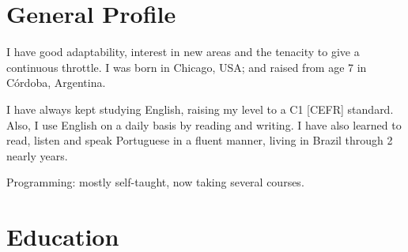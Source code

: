 \section{General Profile}

I have good adaptability, interest in new areas and the tenacity to give a continuous throttle. I was born in Chicago, USA; and raised from age 7 in Córdoba, Argentina. 

I have always kept studying English, raising my level to a C1 [CEFR] standard. Also, I use English on a  daily basis by reading and writing. I have also learned to read, listen and speak Portuguese in a fluent manner, living in Brazil through 2 nearly years. 

Programming: mostly self-taught, now taking several courses.



\section{Education}

